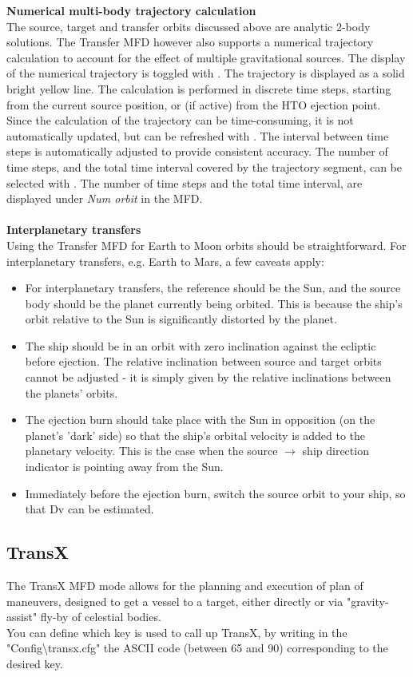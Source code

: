 \documentclass[Orbiter User Manual.tex]{subfiles}
\begin{document}
\textbf{Numerical multi-body trajectory calculation}\\
The source, target and transfer orbits discussed above are analytic 2-body solutions. The Transfer MFD however also supports a numerical trajectory calculation to account for the effect of multiple gravitational sources. The display of the numerical trajectory is toggled with \Shift{}. The trajectory is displayed as a solid bright yellow line. The calculation is performed in discrete time steps, starting from the current source position, or (if active) from the HTO ejection point. Since the calculation of the trajectory can be time-consuming, it is not automatically updated, but can be refreshed with \Shift{}. The interval between time steps is automatically adjusted to provide consistent accuracy. The number of time steps, and the total time interval covered by the trajectory segment, can be selected with \Shift{}. The number of time steps and the total time interval, are displayed under \textit{Num orbit} in the MFD.\\
\\
\textbf{Interplanetary transfers}\\
Using the Transfer MFD for Earth to Moon orbits should be straightforward. For interplanetary transfers, e.g. Earth to Mars, a few caveats apply:
\begin{itemize}
\item For interplanetary transfers, the reference should be the Sun, and the source body should be the planet currently being orbited. This is because the ship's orbit relative to the Sun is significantly distorted by the planet.
\item The ship should be in an orbit with zero inclination against the ecliptic before ejection. The relative inclination between source and target orbits cannot be adjusted - it is simply given by the relative inclinations between the planets' orbits.
\item The ejection burn should take place with the Sun in opposition (on the planet's 'dark' side) so that the ship's orbital velocity is added to the planetary velocity. This is the case when the source $\rightarrow$ ship direction indicator is pointing away from the Sun.
\item Immediately before the ejection burn, switch the source orbit to your ship, so that Dv can be estimated.
\end{itemize}



\subsection{TransX}
\label{ssec:mfd_transx}
The TransX MFD mode allows for the planning and execution of plan of maneuvers, designed to get a vessel to a target, either directly or via "gravity-assist" fly-by of celestial bodies.\\
You can define which key is used to call up TransX, by writing in the "Config\textbackslash transx.cfg" the ASCII code (between 65 and 90) corresponding to the desired key.\\
\end{document}
